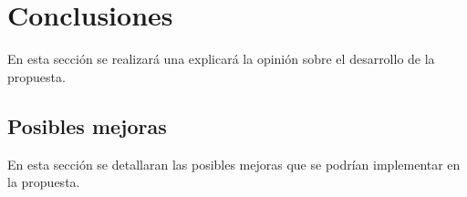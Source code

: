 
\chapter{Conclusiones}

En esta sección se realizará una explicará la opinión sobre el desarrollo de la propuesta.

\section{Posibles mejoras}
En esta sección se detallaran las posibles mejoras que se podrían implementar en la propuesta.
